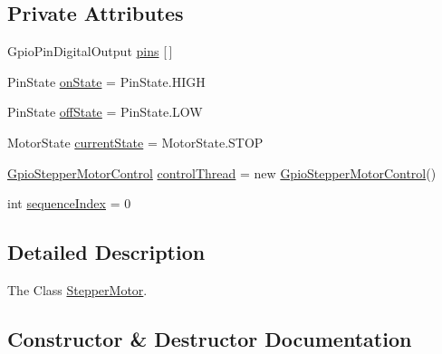 \subsection*{Private Attributes}
\begin{DoxyCompactItemize}
\item 
Gpio\+Pin\+Digital\+Output \hyperlink{classcom_1_1libsensorj_1_1concreteactuator_1_1StepperMotor_aefca907f907fd398b7bcdd902e04b928}{pins} \mbox{[}$\,$\mbox{]}
\item 
Pin\+State \hyperlink{classcom_1_1libsensorj_1_1concreteactuator_1_1StepperMotor_abcf0537132ae7308214b40125aaeef27}{on\+State} = Pin\+State.\+H\+I\+G\+H
\item 
Pin\+State \hyperlink{classcom_1_1libsensorj_1_1concreteactuator_1_1StepperMotor_a44204d0df9f310e95185bea229c1d23d}{off\+State} = Pin\+State.\+L\+O\+W
\item 
Motor\+State \hyperlink{classcom_1_1libsensorj_1_1concreteactuator_1_1StepperMotor_a89b1f9ca70656dedab935870972acf79}{current\+State} = Motor\+State.\+S\+T\+O\+P
\item 
\hyperlink{classcom_1_1libsensorj_1_1concreteactuator_1_1StepperMotor_1_1GpioStepperMotorControl}{Gpio\+Stepper\+Motor\+Control} \hyperlink{classcom_1_1libsensorj_1_1concreteactuator_1_1StepperMotor_a3fbdbefa640e24fa09c78962c56aabef}{control\+Thread} = new \hyperlink{classcom_1_1libsensorj_1_1concreteactuator_1_1StepperMotor_1_1GpioStepperMotorControl}{Gpio\+Stepper\+Motor\+Control}()
\item 
int \hyperlink{classcom_1_1libsensorj_1_1concreteactuator_1_1StepperMotor_adc7f82436f61b2a32539f5af34b1c681}{sequence\+Index} = 0
\end{DoxyCompactItemize}


\subsection{Detailed Description}
The Class \hyperlink{classcom_1_1libsensorj_1_1concreteactuator_1_1StepperMotor}{Stepper\+Motor}. 

\subsection{Constructor \& Destructor Documentation}
\hypertarget{classcom_1_1libsensorj_1_1concreteactuator_1_1StepperMotor_a8b5f85a0849fd8de39b415e5cb2903ba}{}
